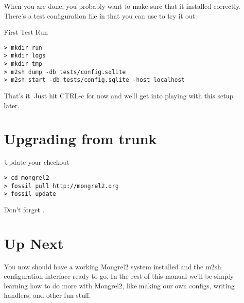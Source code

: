 When you are done, you probably want to make sure that it installed correctly.
There's a test configuration file in  that you can
use to try it out:

\begin{code}{First Test Run}
\begin{Verbatim}
> mkdir run
> mkdir logs
> mkdir tmp
> m2sh dump -db tests/config.sqlite
> m2sh start -db tests/config.sqlite -host localhost
\end{Verbatim}
\end{code}

That's it.  Just hit CTRL-c for now and we'll get into playing with this
setup later.

\section{Upgrading from trunk}
\begin{code}{Update your checkout}
\begin{Verbatim}
> cd mongrel2
> fossil pull http://mongrel2.org
> fossil update
\end{Verbatim}
\end{code}

Don't forget .


\section{Up Next}

You now should have a working Mongrel2 system installed and the m2sh configuration
interface ready to go.  In the rest of this manual we'll be simply learning how
to do more with Mongrel2, like making our own configs, writing handlers, and other
fun stuff.

